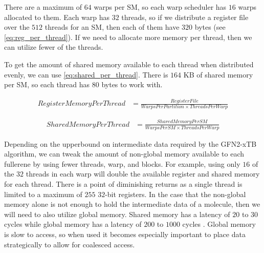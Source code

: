 There are a maximum of $64$ warps per SM, so each warp scheduler has $16$ warps allocated to them. Each warp has $32$ threads, so if we distribute a register file over the $512$ threads for an SM, then each of them have $320$ bytes (see \autoref{eq:reg_per_thread}). If we need to allocate more memory per thread, then we can utilize fewer of the threads.

To get the amount of shared memory available to each thread when distributed evenly, we can use \autoref{eq:shared_per_thread}. There is $164$ KB of shared memory per SM, so each thread has $80$ bytes to work with.

\begin{equation}
\begin{split}
        RegisterMemoryPerThread &= \frac{RegisterFile}{WarpsPerPartition \times ThreadsPerWarp} \label{eq:reg_per_thread}
\end{split}
\end{equation}

\begin{equation}
\begin{split}
        SharedMemoryPerThread &= \frac{SharedMemoryPerSM}{WarpsPerSM \times ThreadsPerWarp} \label{eq:shared_per_thread}
\end{split}
\end{equation}


Depending on the upperbound on intermediate data required by the GFN2-xTB algorithm, we can tweak the amount of non-global memory available to each fullerene by using fewer threads, warp, and blocks. For example, using only $16$ of the $32$ threads in each warp will double the available register and shared memory for each thread. There is a point of diminishing returns as a single thread is limited to a maximum of $255$ $32$-bit registers. In the case that the non-global memory alone is not enough to hold the intermediate data of a molecule, then we will need to also utilize global memory. Shared memory has a latency of $20$ to $30$ cycles while global memory has a latency of $200$ to $1000$ cycles \cite{nasa-nvidia-basics}. Global memory is slow to access, so when used it becomes especially important to place data strategically to allow for coalesced access.

